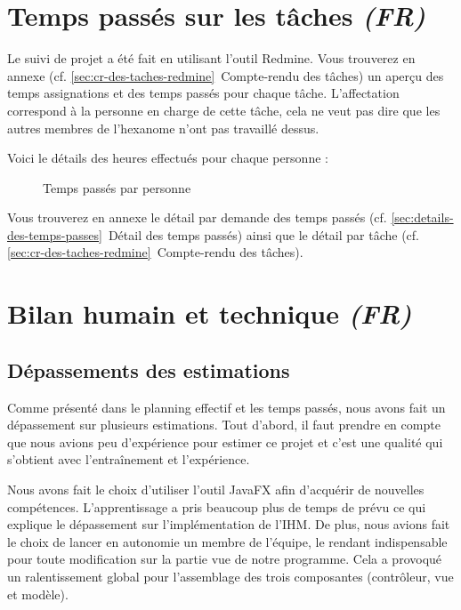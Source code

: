 \documentclass[paper=a4, fontsize=11pt]{report}
\numberwithin{equation}{section}		%
\numberwithin{figure}{section}		%
\numberwithin{table}{section}		%
\renewcommand{\it}[1]{\textit{#1}}
\begin{document}
\section{Temps passés sur les tâches \it{(FR)}}
\label{sec:temps-passes-sur-les-taches}

Le suivi de projet a été fait en utilisant l'outil Redmine. Vous trouverez en annexe (cf. \ref{sec:cr-des-taches-redmine}~Compte-rendu des tâches) un aperçu des temps assignations et des temps passés pour chaque tâche. L'affectation correspond à la personne en charge de cette tâche, cela ne veut pas dire que les autres membres de l'hexanome n'ont pas travaillé dessus.

Voici le détails des heures effectués pour chaque personne :

\begin{figure}[H]
\centering
{}
\caption{Temps passés par personne}
\end{figure}

Vous trouverez en annexe le détail par demande des temps passés (cf. \ref{sec:details-des-temps-passes}~Détail des temps passés) ainsi que le détail par tâche (cf. \ref{sec:cr-des-taches-redmine}~Compte-rendu des tâches).

\section{Bilan humain et technique \it{(FR)}}
\label{sec:bilan-humain-et-technique}

\subsection{Dépassements des estimations}
\label{subsec:depassements-des-estimations}

Comme présenté dans le planning effectif et les temps passés, nous avons fait un dépassement sur plusieurs estimations. Tout d'abord, il faut prendre en compte que nous avions peu d'expérience pour estimer ce projet et c'est une qualité qui s'obtient avec l’entraînement et l'expérience.

Nous avons fait le choix d'utiliser l'outil JavaFX afin d'acquérir de nouvelles compétences. L'apprentissage a pris beaucoup plus de temps de prévu ce qui explique le dépassement sur l'implémentation de l'IHM. De plus, nous avions fait le choix de lancer en autonomie un membre de l'équipe, le rendant indispensable pour toute modification sur la partie vue de notre programme. Cela a provoqué un ralentissement global pour l'assemblage des trois composantes (contrôleur, vue et modèle).
\end{document}
